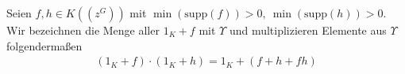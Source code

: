 \begin{defn}
Seien $f, h\in  K\left(\left(z^{G}\right)\right)$ mit $\min(\text{supp}(f)) >0,~ \min(\text{supp}(h)) >0$. Wir bezeichnen die Menge aller $1_K + f$ mit $\Upsilon$ und multiplizieren Elemente aus $\Upsilon$ folgendermaßen
\begin{eqnarray*}
 \left(1_K + f\right) \cdot \left(1_K + h\right) = 1_K + \left(f+h+fh\right)
\end{eqnarray*} 
\end{defn}
%
%
%
%
%
%

